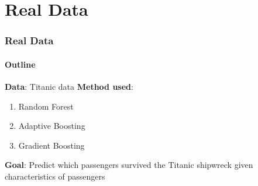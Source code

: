 \section{Real Data}
\frame{\sectionpage}
\begin{frame}[fragile] %
    \frametitle{Real Data}
    \framesubtitle{Outline}
    \textbf{Data}: Titanic data
\vspace{1ex}
    \newline \textbf{Method used}: 
\vspace{1ex}
    \begin{enumerate}
        \item Random Forest
        \item Adaptive Boosting 
        \item Gradient Boosting
    \end{enumerate}
\vspace{1ex}
    \textbf{Goal}: Predict which passengers survived the Titanic shipwreck given characteristics of passengers
\end{frame}
    

